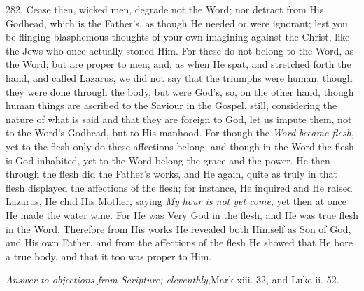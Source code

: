 282. Cease then,
wicked men, degrade not the Word; nor detract from His Godhead, which
is the Father's, as though He needed or were ignorant; lest you be
flinging blasphemous thoughts of your own imagining against the
Christ, like the Jews who once actually stoned Him. For these do not
belong to the Word, as the Word; but are proper to men; and, as when
He spat, and stretched forth the hand, and called Lazarus, we did not
say that the triumphs were human, though they were done through the
body, but were God's, so, on the other hand, though human things are
ascribed to the Saviour in the Gospel, still, considering the nature
of what is said and that they are foreign to God, let us impute them,
not to the Word's Godhead, but to His manhood. For though the \emph{Word
became flesh}, yet to the flesh only do these affections belong;
and though in the Word the flesh is God-inhabited, yet to the Word
belong the grace and the power. He then through the flesh did the
Father's works, and He again, quite as truly in that flesh displayed
the affections of the flesh; for instance, He inquired and He raised
Lazarus, He chid His Mother, saying \emph{My hour is not yet come},
yet then at once He made the water wine. For He was Very God in the
flesh, and He was true flesh in the Word. Therefore from His works He
revealed both Himself as Son of God, and His own Father, and from the
affections of the flesh He showed that He bore a true body, and that
it too was proper to Him.


\emph{Answer
to objections from Scripture; eleventhly,}Mark
xiii. 32, and Luke ii. 52.

